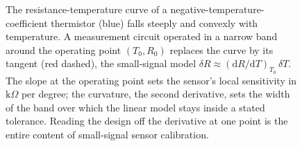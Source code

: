 \begin{figure}[ht]
\caption[Operating-point linearisation of a thermistor]{The
resistance-temperature curve of a negative-temperature-coefficient
thermistor (blue) falls steeply and convexly with temperature. A
measurement circuit operated in a narrow band around the operating
point $(T_{0}, R_{0})$ replaces the curve by its tangent (red dashed),
the small-signal model $\delta R \approx (\mathrm{d}R/\mathrm{d}T)_{T_{0}}
\,\delta T$. The slope at the operating point sets the sensor's local
sensitivity in $\mathrm{k}\Omega$ per degree; the curvature, the
second derivative, sets the width of the band over which the linear
model stays inside a stated tolerance. Reading the design off the
derivative at one point is the entire content of small-signal sensor
calibration.}
\label{fig:vol02:ch05:operating-point}
\end{figure}
